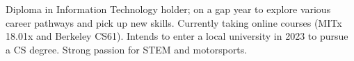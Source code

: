 

\begin{cvparagraph}

Diploma in Information Technology holder; on a gap year to explore various career pathways and pick up new skills. Currently taking online courses (MITx 18.01x and Berkeley CS61).
Intends to enter a local university in 2023 to pursue a CS degree. Strong passion for STEM and motorsports.
\end{cvparagraph}
